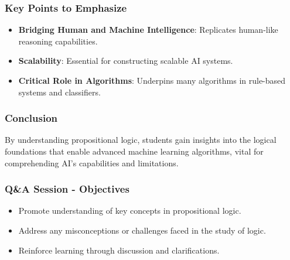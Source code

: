 \documentclass[aspectratio=169]{beamer}
\begin{document}
\begin{frame}[fragile]
    \frametitle{Key Points to Emphasize}
    \begin{itemize}
        \item \textbf{Bridging Human and Machine Intelligence}: Replicates human-like reasoning capabilities.
        \item \textbf{Scalability}: Essential for constructing scalable AI systems.
        \item \textbf{Critical Role in Algorithms}: Underpins many algorithms in rule-based systems and classifiers.
    \end{itemize}
\end{frame}

\begin{frame}[fragile]
    \frametitle{Conclusion}
    By understanding propositional logic, students gain insights into the logical foundations that enable advanced machine learning algorithms, vital for comprehending AI's capabilities and limitations.
\end{frame}

\begin{frame}[fragile]
    \frametitle{Q\&A Session - Objectives}
    \begin{itemize}
        \item Promote understanding of key concepts in propositional logic.
        \item Address any misconceptions or challenges faced in the study of logic.
        \item Reinforce learning through discussion and clarifications.
    \end{itemize}
\end{frame}
\end{document}
